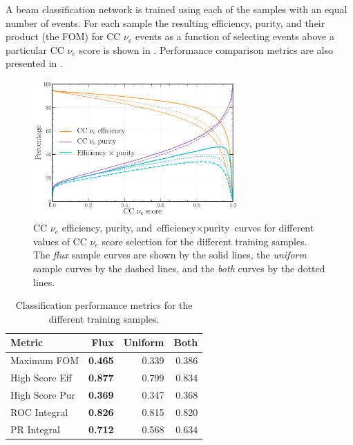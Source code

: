 A beam classification network is trained using each of the samples with an equal number of events.
For each sample the resulting efficiency, purity, and their product (the FOM) for CC $\nu_{e}$
events as a function of selecting events above a particular CC $\nu_{e}$ score is shown in
. Performance comparison metrics are also presented in
.

\begin{figure} %
    \includegraphics[width=0.7\textwidth]{diagrams/7-results/sample_nuel_eff_curves.pdf}
    \caption[CC $\nu_{e}$ efficiency and purity curves for different training samples]
    {CC $\nu_{e}$ efficiency, purity, and $\text{efficiency}\times\text{purity}$ curves for
        different values of CC $\nu_{e}$ score selection for the different training samples. The
        \emph{flux} sample curves are shown by the solid lines, the \emph{uniform} sample curves
        by the dashed lines, and the \emph{both} curves by the dotted lines.}
    \label{fig:sample_nuel_eff_curves}
\end{figure}

\begin{table} %
    \begin{tabular}{lrrr}
        Metric         & Flux           & Uniform & Both  \\
        \midrule
        Maximum FOM    & \textbf{0.465} & 0.339   & 0.386 \\
        High Score Eff & \textbf{0.877} & 0.799   & 0.834 \\
        High Score Pur & \textbf{0.369} & 0.347   & 0.368 \\
        ROC Integral   & \textbf{0.826} & 0.815   & 0.820 \\
        PR Integral    & \textbf{0.712} & 0.568   & 0.634 \\
    \end{tabular}
    \caption[Classification performance metrics for different training samples]
    {Classification performance metrics for the different training samples.}
    \label{tab:sample}
\end{table}

